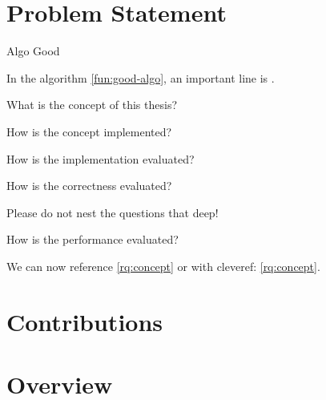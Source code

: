 \section{Problem Statement}

\begin{pseudo}[tbp]
	\caption{Algo Good}
	\label{fun:good-algo}
	\begin{algorithm}[H]
		\PreCode
		
		\StartCode
	\end{algorithm}
\end{pseudo}

In the  algorithm \cref{fun:good-algo}, an important line is .

\begin{rqs}
   \item \label{rq:concept} What is the concept of this thesis?
   \item \label{rq:implementation} How is the concept implemented?
   \item \label{rq:evaluation} How is the implementation evaluated?
   \begin{rqs}
      \item \label{rq:evaluation:correctness} How is the correctness evaluated? \begin{rqs}
         \item Please do not nest the questions that deep!
      \end{rqs}
      \item \label{rq:evaluation:performance} How is the performance evaluated?
   \end{rqs}
\end{rqs}

We can now reference \ref{rq:concept} or with cleveref: \cref{rq:concept}.

\section{Contributions}

\section{Overview}